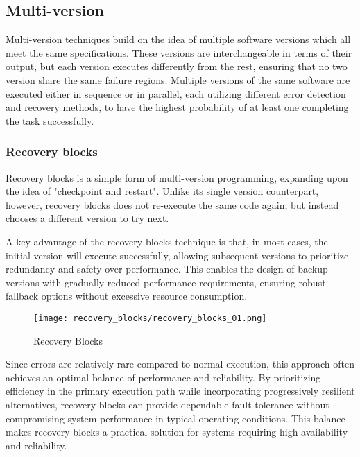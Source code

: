 \subsection{Multi-version} \label{multi}

Multi-version techniques build on the idea of multiple software versions which all meet the same specifications. These versions are interchangeable in terms of their output, but each version executes differently from the rest, ensuring that no two version share the same failure regions.
Multiple versions of the same software are executed either in sequence or in parallel, each utilizing different error detection and recovery methods, to have the highest probability of at least one completing the task successfully.

\subsubsection{Recovery blocks}

Recovery blocks is a simple form of multi-version programming, expanding upon the idea of "checkpoint and restart". Unlike its single version counterpart, however, recovery blocks does not re-execute the same code again, but instead chooses a different version to try next.

A key advantage of the recovery blocks technique is that, in most cases, the initial version will execute successfully, allowing subsequent versions to prioritize redundancy and safety over performance. This enables the design of backup versions with gradually reduced performance requirements, ensuring robust fallback options without excessive resource consumption.

\begin{figure}[hbt!]
    \centering
    \texttt{[image: recovery\_blocks/recovery\_blocks\_01.png]}
    \caption{Recovery Blocks}
    \label{fig:rec_blo}
\end{figure}

\break

Since errors are relatively rare compared to normal execution, this approach often achieves an optimal balance of performance and reliability. By prioritizing efficiency in the primary execution path while incorporating progressively resilient alternatives, recovery blocks can provide dependable fault tolerance without compromising system performance in typical operating conditions. This balance makes recovery blocks a practical solution for systems requiring high availability and reliability.

